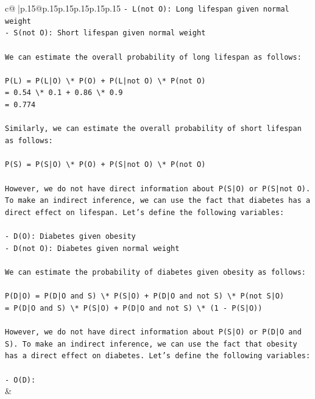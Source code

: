 \documentclass{article}
\begin{document}
{\begin{supertabular}{c@{$\;$}|p{.15\linewidth}@{}p{.15\linewidth}p{.15\linewidth}p{.15\linewidth}p{.15\linewidth}p{.15\linewidth}}
{{{\texttt{{-} L(not O): Long lifespan given normal weight} \\
\texttt{{-} S(not O): Short lifespan given normal weight} \\
\\ 
\texttt{We can estimate the overall probability of long lifespan as follows:} \\
\\ 
\texttt{P(L) = P(L|O) \textbackslash{}* P(O) + P(L|not O) \textbackslash{}* P(not O)} \\
\texttt{= 0.54 \textbackslash{}* 0.1 + 0.86 \textbackslash{}* 0.9} \\
\texttt{= 0.774} \\
\\ 
\texttt{Similarly, we can estimate the overall probability of short lifespan as follows:} \\
\\ 
\texttt{P(S) = P(S|O) \textbackslash{}* P(O) + P(S|not O) \textbackslash{}* P(not O)} \\
\\ 
\texttt{However, we do not have direct information about P(S|O) or P(S|not O). To make an indirect inference, we can use the fact that diabetes has a direct effect on lifespan. Let's define the following variables:} \\
\\ 
\texttt{{-} D(O): Diabetes given obesity} \\
\texttt{{-} D(not O): Diabetes given normal weight} \\
\\ 
\texttt{We can estimate the probability of diabetes given obesity as follows:} \\
\\ 
\texttt{P(D|O) = P(D|O and S) \textbackslash{}* P(S|O) + P(D|O and not S) \textbackslash{}* P(not S|O)} \\
\texttt{= P(D|O and S) \textbackslash{}* P(S|O) + P(D|O and not S) \textbackslash{}* (1 {-} P(S|O))} \\
\\ 
\texttt{However, we do not have direct information about P(S|O) or P(D|O and S). To make an indirect inference, we can use the fact that obesity has a direct effect on diabetes. Let's define the following variables:} \\
\\ 
\texttt{{-} O(D):} \\
            }
        }
    }
    & \\ \\


\end{supertabular}}
\end{document}
